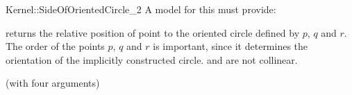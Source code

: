 \begin{ccRefFunctionObjectConcept}{Kernel::SideOfOrientedCircle_2}
A model for this must provide:


         {returns the relative position of point 
          to the oriented circle defined by $p$, $q$ and $r$.
          The order of the points $p$, $q$ and $r$ is important,
          since it determines the orientation of the implicitly
          constructed circle.
          \ccPrecond {} and  are not collinear.}

\ccRefines
{} (with four arguments)

\ccSeeAlso
{} \\


\end{ccRefFunctionObjectConcept}
